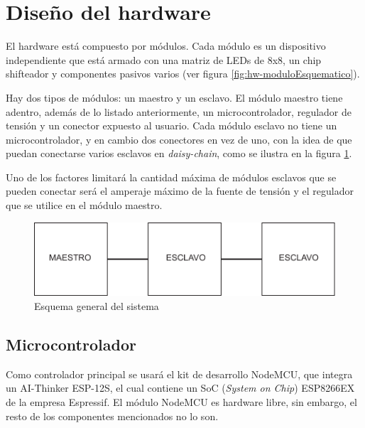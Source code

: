 \section{Diseño del hardware}
El hardware está compuesto por módulos. Cada módulo es un dispositivo independiente que está armado con una matriz de LEDs de 8x8, un chip shifteador \cite{MAX7219} y componentes pasivos varios (ver figura \ref{fig:hw-moduloEsquematico}). 

Hay dos tipos de módulos: un maestro y un esclavo. El módulo maestro tiene adentro, además de lo listado anteriormente, un microcontrolador, regulador de tensión y un conector expuesto al usuario. Cada módulo esclavo no tiene un microcontrolador, y en cambio dos conectores en vez de uno, con la idea de que puedan conectarse varios esclavos en \emph{daisy-chain}, como se ilustra en la figura \ref{fig:esquema-general}.

Uno de los factores limitará la cantidad máxima de módulos esclavos que se pueden conectar será el amperaje máximo de la fuente de tensión y el regulador que se utilice en el módulo maestro.

\begin{figure}[ht!]
	\begin{center}
		\includegraphics[scale=0.8]{imagenes/hw/esquema-general.pdf}
		\caption{Esquema general del sistema}
		\label{fig:esquema-general}
	\end{center}
\end{figure}

\subsection{Microcontrolador}
Como controlador principal se usará el kit de desarrollo NodeMCU, que integra un AI-Thinker ESP-12S, el cual contiene un SoC (\emph{System on Chip}) ESP8266EX de la empresa Espressif. El módulo NodeMCU es hardware libre, sin embargo, el resto de los componentes mencionados no lo son.\cite{NodeMCU}


